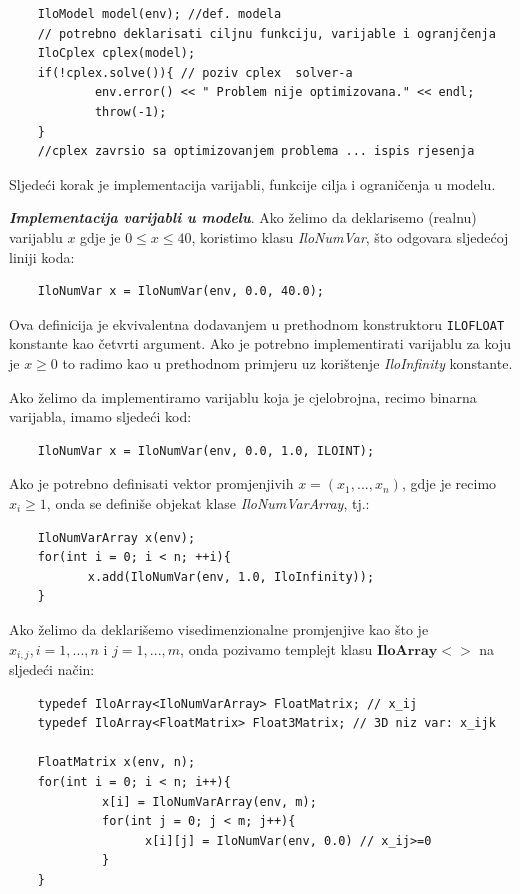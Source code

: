 \documentclass[a4paper, utf8, 11pt, colorlinks]{book}
\begin{document}
 \begin{verbatim}
 	IloModel model(env); //def. modela
 	// potrebno deklarisati ciljnu funkciju, varijable i ogranjčenja
 	IloCplex cplex(model);
 	if(!cplex.solve()){ // poziv cplex  solver-a
 		    env.error() << " Problem nije optimizovana." << endl;
 		    throw(-1);
 	}
 	//cplex zavrsio sa optimizovanjem problema ... ispis rjesenja
 \end{verbatim}
 
 \noindent Sljedeći korak je implementacija varijabli, funkcije cilja i ograničenja u modelu. 
 
 \noindent \textbf{\emph{Implementacija varijabli u modelu}}. Ako želimo da deklarisemo (realnu) varijablu $x$ gdje je $0 \leq x \leq 40$, koristimo klasu \emph{IloNumVar}, što odgovara sljedećoj liniji koda:
 \begin{verbatim}
 	IloNumVar x = IloNumVar(env, 0.0, 40.0);
 \end{verbatim}
 Ova definicija je ekvivalentna dodavanjem u prethodnom konstruktoru \texttt{ILOFLOAT} konstante kao četvrti argument. 
Ako je potrebno implementirati varijablu za koju je $x \geq 0$ to radimo kao u prethodnom primjeru uz korištenje  \emph{IloInfinity} konstante.
 
 Ako želimo da implementiramo varijablu koja je cjelobrojna, recimo binarna varijabla, imamo sljedeći kod:
 \begin{verbatim}
 	IloNumVar x = IloNumVar(env, 0.0, 1.0, ILOINT);
 \end{verbatim}
 
 \noindent Ako je potrebno definisati vektor promjenjivih $x=(x_1,...,x_n)$, gdje je recimo $x_i \geq 1$, onda se definiše objekat klase \emph{IloNumVarArray}, tj.:
 \begin{verbatim}
 	IloNumVarArray x(env);
 	for(int i = 0; i < n; ++i){
 		   x.add(IloNumVar(env, 1.0, IloInfinity));
 	}
 \end{verbatim}
 
 \noindent Ako želimo da deklarišemo visedimenzionalne promjenjive kao što je $x_{i,j}, i=1,...,n$ i $j=1,...,m$, onda pozivamo templejt klasu $\textbf{IloArray}<>$ na sljedeći način:
 
 \begin{verbatim}
 	typedef IloArray<IloNumVarArray> FloatMatrix; // x_ij 
 	typedef IloArray<FloatMatrix> Float3Matrix; // 3D niz var: x_ijk
 	
 	FloatMatrix x(env, n);
 	for(int i = 0; i < n; i++){
 		     x[i] = IloNumVarArray(env, m);
 		     for(int j = 0; j < m; j++){
 		  	       x[i][j] = IloNumVar(env, 0.0) // x_ij>=0
 		     }
 	}
 \end{verbatim}
 
\end{document}
